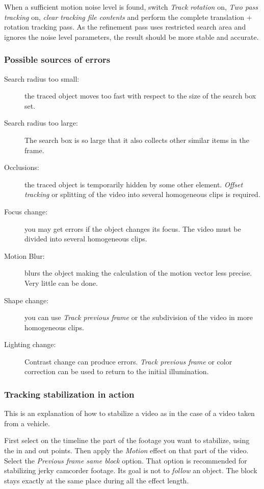 When a sufficient motion noise level is found, switch \textit{Track rotation} on, \textit{Two
pass tracking} on, \textit{clear tracking file contents} and perform the complete
translation + rotation tracking pass.  As the refinement pass uses
restricted search area and ignores the noise level parameters, the result
should be more stable and accurate.

\subsubsection*{Possible sources of errors}
\label{ssub:possible_sources_errors}

\begin{description}
    \item[Search radius too small:] the traced object moves too fast with respect to the size of the search box set.
    \item[Search radius too large:] The search box is so large that it also collects other similar items in the frame.
    \item[Occlusions:] the traced object is temporarily hidden by some other element. \textit{Offset tracking} or splitting of the video into several homogeneous clips is required.
    \item[Focus change:] you may get errors if the object changes its focus. The video must be divided into several homogeneous clips.
    \item[Motion Blur:] blurs the object making the calculation of the motion vector less precise. Very little can be done.
    \item[Shape change:] you can use \textit{Track previous frame} or the subdivision of the video in more homogeneous clips.
    \item[Lighting change:] Contrast change can produce errors. \textit{Track previous frame} or color correction can be used to return to the initial illumination.
\end{description}

\subsubsection*{Tracking stabilization in action}
\label{ssub:tracking_stabilization_action}

This is an explanation of how to stabilize a video as in the case of a video taken from a vehicle.

First select on the timeline the part of the footage you want to stabilize, using the in and out points. Then apply the \textit{Motion} effect on that part of the video. Select the \textit{Previous frame same block} option. That option is recommended for stabilizing jerky camcorder footage. Its goal is not to \textit{follow} an object. The block stays exactly at the same place during all the effect length.

